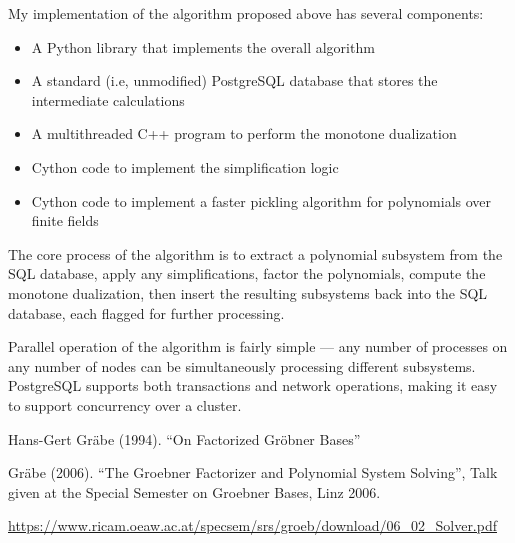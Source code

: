 \documentclass{article}
\begin{document}
My implementation of the algorithm proposed above has several components:

\begin{itemize}
\item A Python library that implements the overall algorithm
\item A standard (i.e, unmodified) PostgreSQL database that stores the intermediate calculations
\item A multithreaded C++ program to perform the monotone dualization
\item Cython code to implement the simplification logic
\item Cython code to implement a faster pickling algorithm for polynomials over finite fields
\end{itemize}

The core process of the algorithm is to extract a polynomial subsystem from the SQL database,
apply any simplifications, factor the polynomials, compute the monotone dualization,
then insert the resulting subsystems back into the SQL database, each flagged for further processing.

Parallel operation of the algorithm is fairly simple --- any number of processes on any
number of nodes can be simultaneously processing different subsystems.  PostgreSQL
supports both transactions and network operations, making it easy to support concurrency
over a cluster.

\vfill\eject
\begin{thebibliography}{9}

Hans-Gert Gr\"abe (1994). ``On Factorized Gr\"obner Bases''

Gr\"abe (2006).  ``The Groebner Factorizer and Polynomial System Solving'',
Talk given at the Special Semester on Groebner Bases, Linz 2006.

\url{https://www.ricam.oeaw.ac.at/specsem/srs/groeb/download/06_02_Solver.pdf}

\end{thebibliography}
\end{document}
